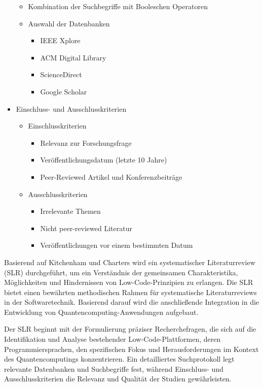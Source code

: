 \begin{itemize}
\begin{itemize}
            \item Kombination der Suchbegriffe mit Booleschen Operatoren
            \item Auswahl der Datenbanken
                \begin{itemize}
                    \item IEEE Xplore
                    \item ACM Digital Library
                    \item ScienceDirect
                    \item Google Scholar
                \end{itemize}
        \end{itemize}
    \item Einschluss- und Ausschlusskriterien
        \begin{itemize}
            \item Einschlusskriterien
                \begin{itemize}
                    \item Relevanz zur Forschungsfrage
                    \item Veröffentlichungsdatum (letzte 10 Jahre)
                    \item Peer-Reviewed Artikel und Konferenzbeiträge
                \end{itemize}
            \item Ausschlusskriterien
                \begin{itemize}
                    \item Irrelevante Themen
                    \item Nicht peer-reviewed Literatur
                    \item Veröffentlichungen vor einem bestimmten Datum
                \end{itemize}
        \end{itemize}
\end{itemize}

Basierend auf Kitchenham und Charters \cite{kitchenham2007guidelines} wird ein systematischer 
Literaturreview (SLR) durchgeführt, um ein Verständnis der gemeinsamen Charakteristika, Möglichkeiten 
und Hindernissen von Low-Code-Prinzipien zu erlangen. Die SLR bietet einen bewährten methodischen 
Rahmen für systematische Literaturreviews in der Softwaretechnik. Basierend darauf wird die 
anschließende Integration in die Entwicklung von Quantencomputing-Anwendungen aufgebaut.

Der SLR beginnt mit der Formulierung präziser Recherchefragen, die sich auf die 
Identifikation und Analyse bestehender Low-Code-Plattformen, deren Programmiersprachen, 
den spezifischen Fokus und Herausforderungen im Kontext des Quantencomputings 
konzentrieren. Ein detailliertes Suchprotokoll legt relevante Datenbanken und 
Suchbegriffe fest, während Einschluss- und Ausschlusskriterien die Relevanz und Qualität 
der Studien gewährleisten.

